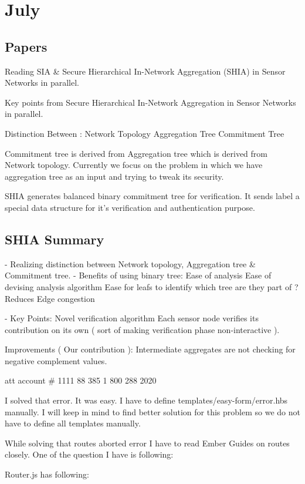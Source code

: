 \chapter{July}

	\section{Papers}

	Reading SIA & Secure Hierarchical In-Network Aggregation (SHIA) in Sensor Networks in parallel.

	Key points from Secure Hierarchical In-Network Aggregation in Sensor Networks in parallel.

		Distinction Between :
			Network Topology
			Aggregation Tree
			Commitment Tree 

			Commitment tree is derived from Aggregation tree which is derived from Network topology. Currently we focus on the problem in which we have aggregation tree as an input and trying to tweak its security. 

		SHIA generates balanced binary commitment tree for verification.
		It sends label a special data structure for it's verification and authentication purpose.


\section{SHIA Summary}

- Realizing distinction between Network topology, Aggregation tree & Commitment tree.
- Benefits of using binary tree:
	Ease of analysis
	Ease of devising analysis algorithm
	Ease for leafs to identify which tree are they part of ? 
	Reduces Edge congestion

- Key Points:
	Novel verification algorithm 
		Each sensor node verifies its contribution on its own ( sort of making  
		 verification phase non-interactive ).

	Improvements ( Our contribution ):
		Intermediate aggregates are not checking for negative complement values.	

att account # 1111 88 385
1 800 288 2020 


I solved that error. It was easy. I have to define templates/easy-form/error.hbs manually. I will keep in mind to find better solution for this problem so we do not have to define all templates manually.

While solving that routes aborted error I have to read Ember Guides on routes closely. One of the question I have is following:

Router.js has following:


    